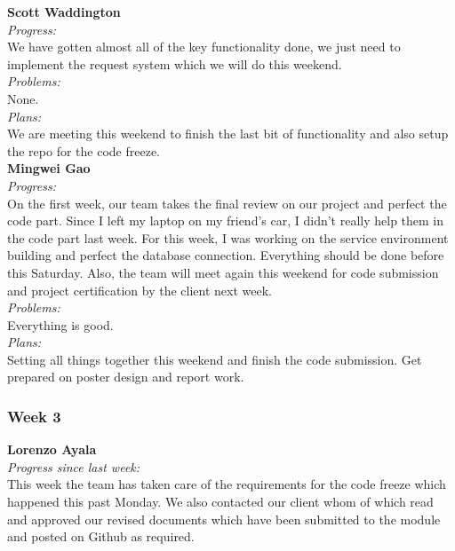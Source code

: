 \noindent\textbf{Scott Waddington}\\
\noindent\textit{Progress:}\\
We have gotten almost all of the key functionality done, we just need to implement the request system which we will do this weekend.\\

\noindent\textit{Problems:}\\
\noindent None.\\

\noindent\textit{Plans:}\\
\noindent We are meeting this weekend to finish the last bit of functionality and also setup the repo for the code freeze.\\

\noindent\textbf{Mingwei Gao}\\
\noindent\textit{Progress:}\\
On the first week, our team takes the final review on our project and perfect the code part. Since I left my laptop on my friend's car, I didn't really help them in the code part last week. For this week, I was working on the service environment building and perfect the database connection. Everything should be done before this Saturday. Also, the team will meet again this weekend for code submission and project certification by the client next week.\\

\noindent\textit{Problems:}\\
\noindent Everything is good.\\

\noindent\textit{Plans:}\\
\noindent Setting all things together this weekend and finish the code submission. Get prepared on poster design and report work.\\

\subsubsection{Week 3}

\textbf{Lorenzo Ayala}\\
\noindent\textit{Progress since last week:}\\
This week the team has taken care of the requirements for the code freeze which happened this past Monday. We also contacted our client whom of which read and approved our revised documents which have been submitted to the module and posted on Github as required. \\

